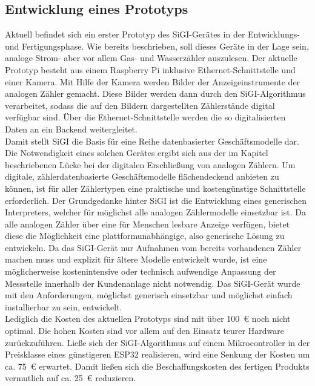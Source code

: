 \subsection{Entwicklung eines Prototyps}
    Aktuell befindet sich ein erster Prototyp des SiGI-Gerätes in der Entwicklungs- und Fertigungsphase. Wie bereits beschrieben, soll dieses Geräte in der Lage sein, analoge Strom- aber vor allem Gas- und Wasserzähler auszulesen. Der aktuelle Prototyp besteht aus einem Raspberry Pi inklusive Ethernet-Schnittstelle und einer Kamera. Mit Hilfe der Kamera werden Bilder der Anzeigeinstrumente der analogen Zähler gemacht. Diese Bilder werden dann durch den SiGI-Algorithmus verarbeitet, sodass die auf den Bildern dargestellten Zählerstände digital verfügbar sind. Über die Ethernet-Schnittstelle werden die so digitalisierten Daten an ein Backend weitergleitet.\\ Damit stellt SiGI die Basis für eine Reihe datenbasierter Geschäftsmodelle dar. Die Notwendigkeit eines solchen Gerätes ergibt sich aus der im Kapitel~ beschriebenen Lücke bei der digitalen Erschließung von analogen Zählern. Um digitale, zählerdatenbasierte Geschäftsmodelle flächendeckend anbieten zu können, ist für aller Zählertypen eine praktische und kostengünstige Schnittstelle erforderlich. Der Grundgedanke hinter SiGI ist die Entwicklung eines generischen Interpreters, welcher für möglichst alle analogen Zählermodelle einsetzbar ist. Da alle analogen Zähler über eine für Menschen lesbare Anzeige verfügen, bietet diese die Möglichkeit eine plattformunabhängige, also generische Lösung zu entwickeln. Da das SiGI-Gerät nur Aufnahmen vom bereits vorhandenen Zähler machen muss und explizit für ältere Modelle entwickelt wurde, ist eine möglicherweise kostenintensive oder technisch aufwendige Anpassung der Messstelle innerhalb der Kundenanlage nicht notwendig. Das SiGI-Gerät wurde mit den Anforderungen, möglichst generisch einsetzbar und möglichst einfach installierbar zu sein, entwickelt.\\ Lediglich die Kosten des aktuellen Prototyps sind mit über \SI{100}{\euro} noch nicht optimal. Die hohen Kosten sind vor allem auf den Einsatz teurer Hardware zurückzuführen. Ließe sich der SiGI-Algorithmus auf einem Mikrocontroller in der Preisklasse eines günstigeren ESP32 realisieren, wird eine Senkung der Kosten um ca. \SI{75}{\euro} erwartet. Damit ließen sich die Beschaffungskosten des fertigen Produkts vermutlich auf ca. \SI{25}{\euro} reduzieren.

